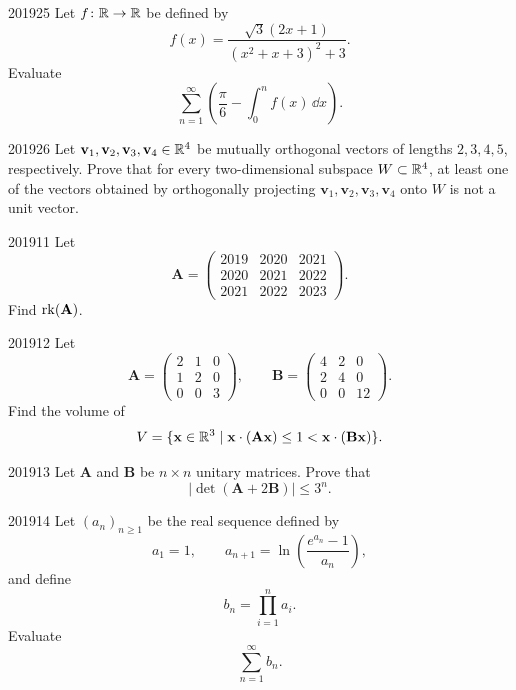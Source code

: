 \begin{problem}{2019}{2}{5}
Let $f\colon\mathbb{R}\to\mathbb{R}$ be defined by
\[
    f(x)=\frac{\sqrt3(2x+1)}{(x^2+x+3)^2+3}.
\]
Evaluate
\[
    \sum_{n=1}^{\infty}
    \left(
        \frac{\pi}{6}-\int_0^n f(x)\, \dd x
    \right).
\]
\end{problem}

\begin{problem}{2019}{2}{6}
Let $\mathbf v_1, \mathbf v_2, \mathbf v_3, \mathbf v_4\in\mathbb{R}^4$ be mutually orthogonal vectors of lengths $2, 3, 4, 5$, respectively. Prove that for every two-dimensional subspace $W\subset\mathbb{R}^4$, at least one of the vectors obtained by orthogonally projecting $\mathbf v_1, \mathbf v_2, \mathbf v_3, \mathbf v_4$ onto $W$ is not a unit vector.
\end{problem}

\begin{problem}{2019}{1}{1}
Let
\[
    \mathbf A=
    \begin{pmatrix}
        2019&2020&2021\\
        2020&2021&2022\\
        2021&2022&2023
    \end{pmatrix}.
\]
Find $\operatorname{rk}(\mathbf A)$.
\end{problem}

\begin{problem}{2019}{1}{2}
Let
\[
    \mathbf A=
    \begin{pmatrix}
        2&1&0\\
        1&2&0\\
        0&0&3
    \end{pmatrix},
    \qquad
    \mathbf B=
    \begin{pmatrix}
        4&2&0\\
        2&4&0\\
        0&0&12
    \end{pmatrix}.
\]
Find the volume of
\[
    V=\{\mathbf x\in\mathbb{R}^3\mid
    \mathbf x\cdot(\mathbf A\mathbf x)\le1
    <\mathbf x\cdot(\mathbf B\mathbf x)\}.
\]
\end{problem}

\begin{problem}{2019}{1}{3}
Let $\mathbf A$ and $\mathbf B$ be $n\times n$ unitary matrices. Prove that
\[
    |\det(\mathbf A+2\mathbf B)|\le3^n.
\]
\end{problem}

\begin{problem}{2019}{1}{4}
Let $(a_n)_{n\ge1}$ be the real sequence defined by
\[
    a_1=1,
    \qquad
    a_{n+1}=\ln\left(\frac{e^{a_n}-1}{a_n}\right),
\]
and define
\[
    b_n=\prod_{i=1}^{n}a_i.
\]
Evaluate
\[
    \sum_{n=1}^{\infty}b_n.
\]
\end{problem}

